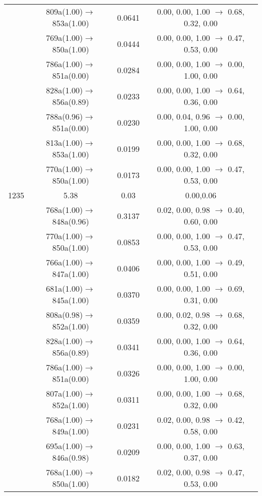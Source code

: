 \documentclass[10pt,a4paper]{article}
\begin{document}
\begin{longtable}{c|c|c|c}
 	& 809a(1.00)$\rightarrow$853a(1.00) &	 0.0641 &	 0.00, 0.00, 1.00 $\rightarrow$ 0.68, 0.32, 0.00 \\ 
 	& 769a(1.00)$\rightarrow$850a(1.00) &	 0.0444 &	 0.00, 0.00, 1.00 $\rightarrow$ 0.47, 0.53, 0.00 \\ 
 	& 786a(1.00)$\rightarrow$851a(0.00) &	 0.0284 &	 0.00, 0.00, 1.00 $\rightarrow$ 0.00, 1.00, 0.00 \\ 
 	& 828a(1.00)$\rightarrow$856a(0.89) &	 0.0233 &	 0.00, 0.00, 1.00 $\rightarrow$ 0.64, 0.36, 0.00 \\ 
 	& 788a(0.96)$\rightarrow$851a(0.00) &	 0.0230 &	 0.00, 0.04, 0.96 $\rightarrow$ 0.00, 1.00, 0.00 \\ 
 	& 813a(1.00)$\rightarrow$853a(1.00) &	 0.0199 &	 0.00, 0.00, 1.00 $\rightarrow$ 0.68, 0.32, 0.00 \\ 
 	& 770a(1.00)$\rightarrow$850a(1.00) &	 0.0173 &	 0.00, 0.00, 1.00 $\rightarrow$ 0.47, 0.53, 0.00 \\ 
 \hline1235 &	 5.38 &	 0.03 &	 0.00,0.06 \\ 
  	& 768a(1.00)$\rightarrow$848a(0.96) &	 0.3137 &	 0.02, 0.00, 0.98 $\rightarrow$ 0.40, 0.60, 0.00 \\ 
 	& 770a(1.00)$\rightarrow$850a(1.00) &	 0.0853 &	 0.00, 0.00, 1.00 $\rightarrow$ 0.47, 0.53, 0.00 \\ 
 	& 766a(1.00)$\rightarrow$847a(1.00) &	 0.0406 &	 0.00, 0.00, 1.00 $\rightarrow$ 0.49, 0.51, 0.00 \\ 
 	& 681a(1.00)$\rightarrow$845a(1.00) &	 0.0370 &	 0.00, 0.00, 1.00 $\rightarrow$ 0.69, 0.31, 0.00 \\ 
 	& 808a(0.98)$\rightarrow$852a(1.00) &	 0.0359 &	 0.00, 0.02, 0.98 $\rightarrow$ 0.68, 0.32, 0.00 \\ 
 	& 828a(1.00)$\rightarrow$856a(0.89) &	 0.0341 &	 0.00, 0.00, 1.00 $\rightarrow$ 0.64, 0.36, 0.00 \\ 
 	& 786a(1.00)$\rightarrow$851a(0.00) &	 0.0326 &	 0.00, 0.00, 1.00 $\rightarrow$ 0.00, 1.00, 0.00 \\ 
 	& 807a(1.00)$\rightarrow$852a(1.00) &	 0.0311 &	 0.00, 0.00, 1.00 $\rightarrow$ 0.68, 0.32, 0.00 \\ 
 	& 768a(1.00)$\rightarrow$849a(1.00) &	 0.0231 &	 0.02, 0.00, 0.98 $\rightarrow$ 0.42, 0.58, 0.00 \\ 
 	& 695a(1.00)$\rightarrow$846a(0.98) &	 0.0209 &	 0.00, 0.00, 1.00 $\rightarrow$ 0.63, 0.37, 0.00 \\ 
 	& 768a(1.00)$\rightarrow$850a(1.00) &	 0.0182 &	 0.02, 0.00, 0.98 $\rightarrow$ 0.47, 0.53, 0.00 \\ 

\end{longtable}
\end{document}
